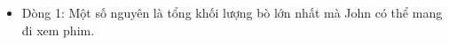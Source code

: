 \begin{itemize}
	\item     Dòng 1: Một số nguyên là tổng khối lượng bò lớn nhất mà John        có thể mang đi xem phim.   
\end{itemize}